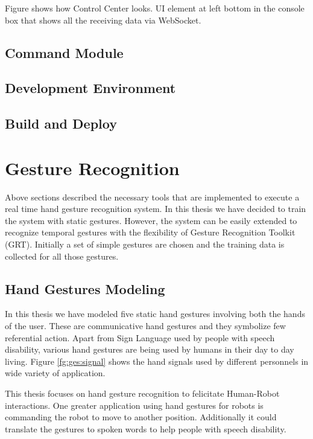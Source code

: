 Figure shows how Control Center looks. UI element at left bottom in the console box that shows all the receiving data via WebSocket. 

\subsection{Command Module} 

\subsection{Development Environment} 

\subsection{Build and Deploy}

\section{Gesture Recognition}
Above sections described the necessary tools that are implemented to execute a real time hand gesture recognition system. In this thesis we have decided to train the system with static gestures. However, the system can be easily extended to recognize temporal gestures with the flexibility of Gesture Recognition Toolkit (GRT). Initially a set of simple gestures are chosen and the training data is collected for all those gestures.

\subsection{Hand Gestures Modeling}
In this thesis we have modeled five static hand gestures involving both the hands of the user. These are communicative hand gestures and they symbolize few referential action. Apart from Sign Language used by people with speech disability, various hand gestures are being used by humans in their day to day living. Figure \ref{fg:ges:signal} shows the hand signals used by different personnels in wide variety of application.



This thesis focuses on hand gesture recognition to felicitate Human-Robot interactions. One greater application using hand gestures for robots is commanding the robot to move to another position. Additionally it could translate the gestures to spoken words to help people with speech disability.   

